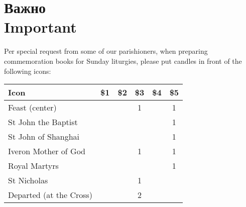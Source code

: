 \section*{Важно\\Important}

Per special request from some of our parishioners, when preparing commemoration books for Sunday liturgies, please put candles in 
front of the following icons:

\begin{longtable}[]{@{}lccccc@{}}
\toprule()
Icon & \$1 & \$2 & \$3 & \$4 & \$5 \\
\midrule()
\endhead
Feast (center) & & & 1 & & 1 \\
St John the Baptist & & & & & 1 \\
St John of Shanghai & & & & & 1 \\
Iveron Mother of God & & & 1 & & 1 \\
Royal Martyrs & & & & & 1 \\
St Nicholas & & & 1 & & \\
Departed (at the Cross) & & & 2 & & \\
\bottomrule()
\end{longtable}

